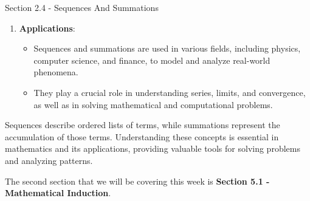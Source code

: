 \begin{notes}{Section 2.4 - Sequences And Summations}
\begin{enumerate}[label=\arabic*.]
        \item \textbf{Applications}:
        \begin{itemize}
            \item Sequences and summations are used in various fields, including physics, computer science, and finance, to model and analyze real-world phenomena.
            \item They play a crucial role in understanding series, limits, and convergence, as well as in solving mathematical and computational problems.
        \end{itemize}
    \end{enumerate}
    
    Sequences describe ordered lists of terms, while summations represent the accumulation of those terms. Understanding these concepts is essential in mathematics and its applications, providing 
    valuable tools for solving problems and analyzing patterns.
\end{notes}

The second section that we will be covering this week is \textbf{Section 5.1 - Mathematical Induction}.


